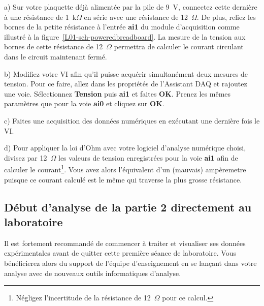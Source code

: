 \documentclass[canadien,12pt,oneside,letterpaper]{article}
\begin{document}
a) Sur votre plaquette déjà alimentée par la pile de 9~V, connectez cette dernière à une résistance de 1~k$\Omega$ en série avec une résistance de 12~$\Omega$. De plus, reliez les bornes de la petite résistance à l'entrée \textbf{ai1} du module d'acquisition comme illustré à la figure~\ref{L01-sch-poweredbreadboard}. La mesure de la tension aux bornes de cette résistance de 12~$\Omega$ permettra de calculer le courant circulant dans le circuit maintenant fermé.

b) Modifiez votre VI afin qu'il puisse acquérir simultanément deux mesures de tension. Pour ce faire, allez dans les propriétés de l'Assistant DAQ et rajoutez une voie. Sélectionnez \textbf{Tension} puis \textbf{ai1} et faites \textbf{OK}. Prenez les mêmes paramètres que pour la voie \textbf{ai0} et cliquez sur \textbf{OK}.

c) Faites une acquisition des données numériques en exécutant une dernière fois le VI.

d) Pour appliquer la loi d'Ohm avec votre logiciel d'analyse numérique choisi, divisez par 12~$\Omega$ les valeurs de tension enregistrées pour la voie \textbf{ai1} afin de calculer le courant\footnote{Négligez l'incertitude de la résistance de 12~$\Omega$ pour ce calcul.}. Vous avez alors l'équivalent d'un (mauvais) ampèremetre puisque ce courant calculé est le même qui traverse la plus grosse résistance. %

\subsection{Début d'analyse de la partie 2 directement au laboratoire}
Il est fortement recommandé de commencer à traiter et visualiser ses données expérimentales avant de quitter cette première séance de laboratoire. Vous bénéficierez alors du support de l'équipe d'enseignement en se lançant dans votre analyse avec de nouveaux outils informatiques d'analyse.
\end{document}
